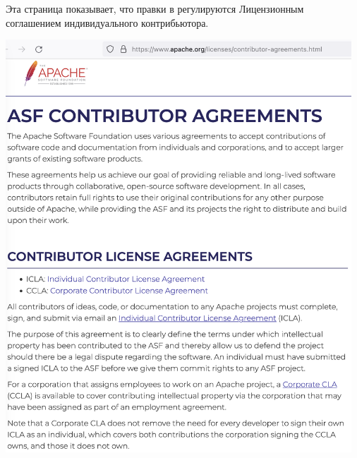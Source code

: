 
Эта страница показывает, что правки в \Asf регулируются Лицензионным соглашением индивидуального контрибьютора.

\begin{center}
    \includegraphics[width=35em]{contributor-agreements}
\end{center}

\pagebreak
